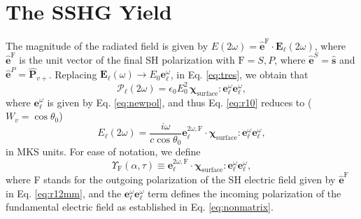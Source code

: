 \documentclass[aps,pra,10pt,amsmath,twocolumn,letterpaper]{revtex4-1}
\begin{document}
\section{The SSHG Yield}

The magnitude of the radiated field is given by $E(2\omega) =
\hat{\mathbf{e}}^{\mathrm{F}}\cdot\mathbf{E}_{\ell}(2\omega)$, where
$\hat{\mathbf{e}}^{\mathrm{F}}$ is the unit vector of the final SH polarization
with $\mathrm{F}=S,P$, where $\hat{\mathbf{e}}^S=\hat{\mathbf{s}}$ and
$\hat{\mathbf{e}}^P=\hat{\mathbf{P}}_{v+}$. Replacing
$\mathbf{E}_{\ell}(\omega)\to E_0\mathbf{e}^{\omega}_\ell$, in Eq.
\eqref{eq:tres}, we obtain that
\begin{equation*}\label{eq:m4}
\boldsymbol{\mathcal{P}}_{\ell}(2\omega) = 
\epsilon_{0}E^{2}_{0}\,
\boldsymbol{\chi}_{\mathrm{surface}}:\mathbf{e}^{\omega}_{\ell}
                                     \mathbf{e}^{\omega}_{\ell},
\end{equation*}
where $\mathbf{e}^{\omega}_{\ell}$ is given by Eq. \eqref{eq:newpol},
and thus Eq. \eqref{eq:r10} reduces to ($W_{v}=\cos\theta_{0}$)
\begin{equation*}\label{eq:mr10}
E_{\ell}(2\omega) 
= \frac{i \omega}{c\cos\theta_{0}}
\mathbf{e}^{2\omega,\mathrm{F}}_{\ell}\cdot
\boldsymbol{\chi}_{\mathrm{surface}}:\mathbf{e}^{\omega}_{\ell}
                                     \mathbf{e}^{\omega}_{\ell},
\end{equation*}
in MKS units. For ease of notation, we define
\begin{equation}\label{eq:mc0}
\Upsilon_{\mathrm{F}}(\alpha,\tau)
\equiv 
\mathbf{e}^{2\omega,\mathrm{F}}_{\ell}\cdot
\boldsymbol{\chi}_{\mathrm{surface}}:\mathbf{e}^{\omega}_{\ell}
                                     \mathbf{e}^{\omega}_{\ell},
\end{equation}
where F stands for the outgoing polarization of the SH electric field given by
$\hat{\mathbf{e}}^{\mathrm{F}}$ in Eq. \eqref{eq:r12mm}, and the
$\mathbf{e}^{\omega}_{\ell}\mathbf{e}^{\omega}_{\ell}$ term defines the incoming
polarization of the fundamental electric field as established in Eq.
\eqref{eq:nonmatrix}.
\end{document}

